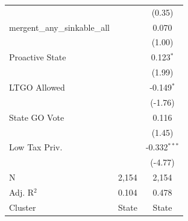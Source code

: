 \begin{tabular*}{\textwidth}{@{\extracolsep{\fill}}lcc}
                                                      &               & (0.35)\\   
   mergent\_any\_sinkable\_all                        &               & 0.070\\   
                                                      &               & (1.00)\\   
   Proactive State                                    &               & 0.123$^{*}$\\   
                                                      &               & (1.99)\\   
   LTGO Allowed                                       &               & -0.149$^{*}$\\   
                                                      &               & (-1.76)\\   
   State GO Vote                                      &               & 0.116\\   
                                                      &               & (1.45)\\   
   Low Tax Priv.                                      &               & -0.332$^{***}$\\   
                                                      &               & (-4.77)\\   
   \hline
   N                                       & 2,154         & 2,154\\  
   Adj. R$^2$                                     & 0.104         & 0.478\\  
   Cluster              & State & State\\  
   \bottomrule
\end{tabular*}
\par\endgroup
